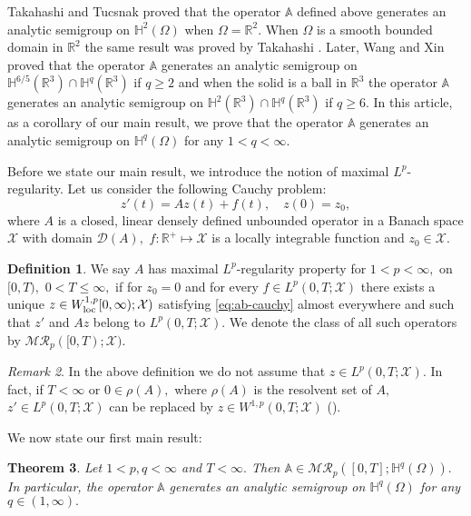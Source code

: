 \documentclass[12pt,a4paper,reqno]{amsart}
\newtheorem{theorem}{Theorem}[section]
\theoremstyle{definition}
\newtheorem{definition}[theorem]{Definition}
\theoremstyle{remark}
\newtheorem{remark}[theorem]{Remark}
\numberwithin{equation}{section}
\newcommand{\rt}{\mathbb{R}^{3}}
\newcommand{\mx}{\mathcal{X}}
\newcommand{\md}{\mathcal{D}}
\begin{document}
Takahashi and Tucsnak \cite{TT1}   proved that  the operator $\mathbb{A}$ defined above generates an analytic semigroup on $\mathbb{H}^{2}(\Omega)$ when $\Omega = \mathbb{R}^{2}.$
When  $\Omega$ is a smooth bounded domain in  $\mathbb{R}^{2}$ the same result was proved by Takahashi \cite{TT2}. Later, Wang and Xin \cite{WX11} proved that the operator $\mathbb{A}$ generates an analytic semigroup on
$\mathbb{H}^{6/5}(\rt) \cap \mathbb{H}^{q}(\rt)$ if $q \geqslant 2$ and when the solid is a ball in $\rt$ the operator $\mathbb{A}$ generates an analytic semigroup on $\mathbb{H}^{2}(\rt) \cap \mathbb{H}^{q}(\rt)$ if $q \geqslant 6.$ In this article, as a corollary of our main result, we prove that the operator $\mathbb{A}$ generates an analytic semigroup on $\mathbb{H}^{q}(\Omega)$ for any $1 < q < \infty.$   


Before we state our main result, we introduce the notion of maximal $L^{p}$-regularity. Let us consider the following Cauchy  problem:
\begin{equation} \label{eq:ab-cauchy}
z'(t) = A z(t) + f(t), \quad z(0) = z_{0},
\end{equation}
where $A$ is a closed, linear  densely defined unbounded operator in a Banach space $\mx$ with domain $\md(A),$  $f : \mathbb{R}^{+} \mapsto \mx$ is a locally integrable function and $z_{0} \in \mx.$

\begin{definition}
We say $A$ has maximal $L^{p}$-regularity property for $1 < p < \infty,$ on $[0,T),$ $0 < T \leqslant \infty,$ if for  $z_{0} = 0$ and for every $f \in L^{p}(0,T;\mx)$  there exists a unique $z\in W^{1,p}_{\rm loc}[0,\infty);\mx)$ satisfying \eqref{eq:ab-cauchy} almost everywhere and such that $z'$ and $Az$ belong to $L^{p}(0,T;\mx).$ We denote the class of all such operators by $\mathcal{MR}_{p}([0,T);\mx).$
\end{definition}

\begin{remark}
In the above definition we do not  assume that $z \in L^{p}(0,T;\mx).$ In fact, if $T < \infty$ or $0 \in \rho(A),$ where $\rho(A)$ is the resolvent set of $A,$ $z' \in L^{p}(0,T;\mx)$ can be replaced by $z \in W^{1,p}(0,T;\mx)$ (\cite[Theorem 2.4]{Dor1993}).
\end{remark}

We now state our first main result:
\begin{theorem} \label{th:main1}
Let  $1< p,q < \infty$ and $T < \infty.$ Then $\mathbb{A} \in \mathcal{MR}_{p}([0,T]; \mathbb{H}^{q}(\Omega)).$ In particular,  the operator $\mathbb{A}$ generates an analytic semigroup on  $\mathbb{H}^{q}(\Omega)$
for any $q\in (1,\infty).$
\end{theorem}
\end{document}

